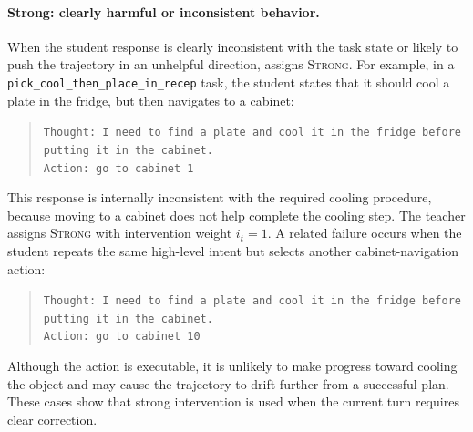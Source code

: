\paragraph{Strong: clearly harmful or inconsistent behavior.}
When the student response is clearly inconsistent with the task state or likely to push the trajectory in an unhelpful direction, \ours{} assigns \textsc{Strong}.
%
For example, in a \texttt{pick\_cool\_then\_place\_in\_recep} task, the student states that it should cool a plate in the fridge, but then navigates to a cabinet:
%
\begin{quote}
\small
\texttt{Thought: I need to find a plate and cool it in the fridge before putting it in the cabinet.}\\
\texttt{Action: go to cabinet 1}
\end{quote}
%
This response is internally inconsistent with the required cooling procedure, because moving to a cabinet does not help complete the cooling step.
%
The teacher assigns \textsc{Strong} with intervention weight $i_t=1$.
%
A related failure occurs when the student repeats the same high-level intent but selects another cabinet-navigation action:
%
\begin{quote}
\small
\texttt{Thought: I need to find a plate and cool it in the fridge before putting it in the cabinet.}\\
\texttt{Action: go to cabinet 10}
\end{quote}
%
Although the action is executable, it is unlikely to make progress toward cooling the object and may cause the trajectory to drift further from a successful plan.
%
These cases show that strong intervention is used when the current turn requires clear correction.

